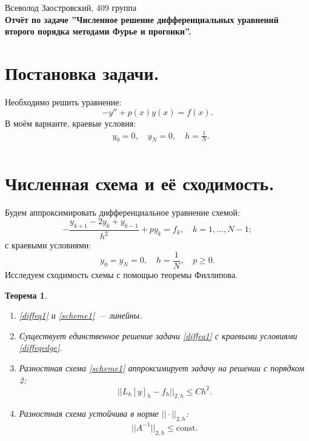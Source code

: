 \documentclass[14pt,a4paper]{extarticle}
\newtheorem{theorem}{Теорема} %
\newcommand{\1}{\mathbbm{1}}
\begin{document}
\begin{center}

    {Всеволод Заостровский, 409 группа}\\
    {\bfseries Отчёт по задаче ''Численное решение дифференциальных уравнений второго порядка методами Фурье и прогонки''.\\}
    \vspace{1cm}

\end{center}

\section{Постановка задачи.} Необходимо решить уравнение:
\begin{equation} \label{diffeq1}
    -y'' + p(x) y(x) = f(x).
\end{equation}
В моём варианте, краевые условия:
\begin{align} \label{diffeqedge}
    & y_0 = 0, \quad y_N = 0, \quad h = \frac{1}{N}. \\
\end{align}

\section{Численная схема и её сходимость.}

Будем аппроксимировать дифференциальное уравнение схемой:
\begin{equation} \label{scheme1}
    -\frac{y_{k+1} - 2 y_k + y_{k-1}}{h^2} + p y_k = f_k, \quad k = 1, \ldots, N - 1;
\end{equation}
с краевыми условиями:
\begin{equation} \label{schemeedge}
    y_0 = y_N = 0,
    \quad h = \frac{1}{N}, 
    \quad p \geq 0.
\end{equation}
Исследуем сходимость схемы с помощью теоремы Филлипова.
\begin{theorem}
    \begin{enumerate}
        \item \eqref{diffeq1} и \eqref{scheme1} --- линейны.
        \item Существует единственное решение задачи \eqref{diffeq1} с краевыми условиями \eqref{diffeqedge}.
        \item Разностная схема \eqref{scheme1} аппроксимирует задачу на решении с порядком 2:
            \begin{equation*}
                || L_h [y]_h - f_h || _{2, h} \leq C h^2.           
            \end{equation*}
        \item Разностная схема устойчива в норме $||\cdot||_{2,h}$:
        \begin{equation*}
            || A^{-1} ||_{2,h} \leq \text{const}.
        \end{equation*}
    \end{enumerate}
\end{theorem}
\end{document}
